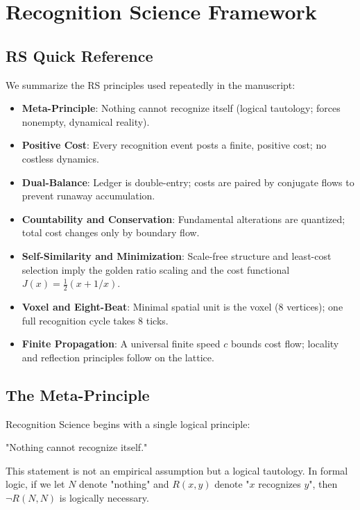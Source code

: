 \documentclass[11pt]{amsart}
\theoremstyle{plain}
\theoremstyle{definition}
\theoremstyle{remark}
\begin{document}
\section{Recognition Science Framework}
\subsection{RS Quick Reference}
We summarize the RS principles used repeatedly in the manuscript:
\begin{itemize}
  \item \textbf{Meta-Principle}: Nothing cannot recognize itself (logical tautology; forces nonempty, dynamical reality).
  \item \textbf{Positive Cost}: Every recognition event posts a finite, positive cost; no costless dynamics.
  \item \textbf{Dual-Balance}: Ledger is double-entry; costs are paired by conjugate flows to prevent runaway accumulation.
  \item \textbf{Countability and Conservation}: Fundamental alterations are quantized; total cost changes only by boundary flow.
  \item \textbf{Self-Similarity and Minimization}: Scale-free structure and least-cost selection imply the golden ratio scaling and the cost functional $J(x)=\tfrac12(x+1/x)$.
  \item \textbf{Voxel and Eight-Beat}: Minimal spatial unit is the voxel (8 vertices); one full recognition cycle takes 8 ticks.
  \item \textbf{Finite Propagation}: A universal finite speed $c$ bounds cost flow; locality and reflection principles follow on the lattice.
\end{itemize}

\subsection{The Meta-Principle}

Recognition Science begins with a single logical principle:

\begin{principle}
"Nothing cannot recognize itself."
\end{principle}

This statement is not an empirical assumption but a logical tautology. In formal logic, if we let $N$ denote "nothing" and $R(x,y)$ denote "$x$ recognizes $y$", then $\neg R(N,N)$ is logically necessary.
\end{document}
